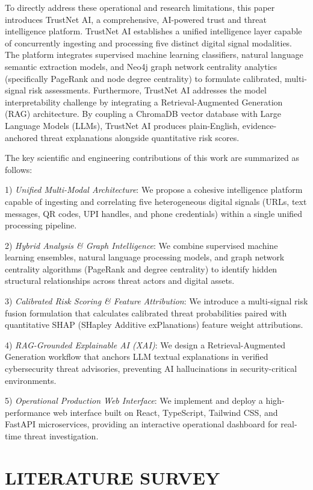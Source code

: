 \documentclass[conference,a4paper]{IEEEtran}
\begin{document}
To directly address these operational and research limitations, this paper introduces TrustNet AI, a comprehensive, AI-powered trust and threat intelligence platform. TrustNet AI establishes a unified intelligence layer capable of concurrently ingesting and processing five distinct digital signal modalities. The platform integrates supervised machine learning classifiers, natural language semantic extraction models, and Neo4j graph network centrality analytics (specifically PageRank and node degree centrality) to formulate calibrated, multi-signal risk assessments. Furthermore, TrustNet AI addresses the model interpretability challenge by integrating a Retrieval-Augmented Generation (RAG) architecture. By coupling a ChromaDB vector database with Large Language Models (LLMs), TrustNet AI produces plain-English, evidence-anchored threat explanations alongside quantitative risk scores.

The key scientific and engineering contributions of this work are summarized as follows:

1) \textit{Unified Multi-Modal Architecture}: We propose a cohesive intelligence platform capable of ingesting and correlating five heterogeneous digital signals (URLs, text messages, QR codes, UPI handles, and phone credentials) within a single unified processing pipeline.

2) \textit{Hybrid Analysis \& Graph Intelligence}: We combine supervised machine learning ensembles, natural language processing models, and graph network centrality algorithms (PageRank and degree centrality) to identify hidden structural relationships across threat actors and digital assets.

3) \textit{Calibrated Risk Scoring \& Feature Attribution}: We introduce a multi-signal risk fusion formulation that calculates calibrated threat probabilities paired with quantitative SHAP (SHapley Additive exPlanations) feature weight attributions.

4) \textit{RAG-Grounded Explainable AI (XAI)}: We design a Retrieval-Augmented Generation workflow that anchors LLM textual explanations in verified cybersecurity threat advisories, preventing AI hallucinations in security-critical environments.

5) \textit{Operational Production Web Interface}: We implement and deploy a high-performance web interface built on React, TypeScript, Tailwind CSS, and FastAPI microservices, providing an interactive operational dashboard for real-time threat investigation.

\section{LITERATURE SURVEY}
\end{document}
